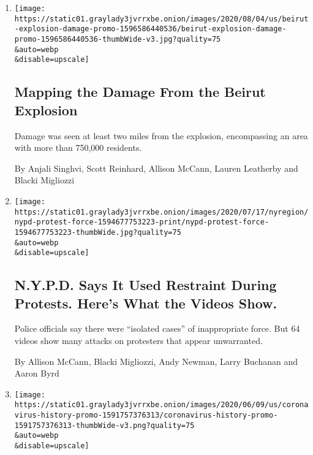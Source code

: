 \begin{enumerate}
\def\labelenumi{\arabic{enumi}.}
\item
  \href{/interactive/2020/08/04/world/middleeast/beirut-explosion-damage.html}{}

  \texttt{[image: https://static01.graylady3jvrrxbe.onion/images/2020/08/04/us/beirut-explosion-damage-promo-1596586440536/beirut-explosion-damage-promo-1596586440536-thumbWide-v3.jpg?quality=75\\\&auto=webp\\\&disable=upscale]}

  \hypertarget{mapping-the-damage-from-the-beirut-explosion}{%
  \subsection{Mapping the Damage From the Beirut
  Explosion}\label{mapping-the-damage-from-the-beirut-explosion}}

  Damage was seen at least two miles from the explosion, encompassing an
  area with more than 750,000 residents.

  By Anjali Singhvi, Scott Reinhard, Allison McCann, Lauren Leatherby
  and Blacki Migliozzi
\item
  \href{/interactive/2020/07/14/nyregion/nypd-george-floyd-protests.html}{}

  \texttt{[image: https://static01.graylady3jvrrxbe.onion/images/2020/07/17/nyregion/nypd-protest-force-1594677753223-print/nypd-protest-force-1594677753223-thumbWide.jpg?quality=75\\\&auto=webp\\\&disable=upscale]}

  \hypertarget{nypd-says-it-used-restraint-during-protests-heres-what-the-videos-show}{%
  \subsection{N.Y.P.D. Says It Used Restraint During Protests. Here's
  What the Videos
  Show.}\label{nypd-says-it-used-restraint-during-protests-heres-what-the-videos-show}}

  Police officials say there were ``isolated cases'' of inappropriate
  force. But 64 videos show many attacks on protesters that appear
  unwarranted.

  By Allison McCann, Blacki Migliozzi, Andy Newman, Larry Buchanan and
  Aaron Byrd
\item
  \href{/interactive/2020/06/10/world/coronavirus-history.html}{}

  \texttt{[image: https://static01.graylady3jvrrxbe.onion/images/2020/06/09/us/coronavirus-history-promo-1591757376313/coronavirus-history-promo-1591757376313-thumbWide-v3.png?quality=75\\\&auto=webp\\\&disable=upscale]}


\end{enumerate}
